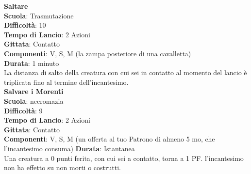 \begin{multicols}{2}
\medskip\textbf{Saltare}\\
\textbf{Scuola}: Trasmutazione\\
\textbf{Difficoltà}:  10\\
\textbf{Tempo di Lancio}: 2 Azioni\\
\textbf{Gittata}: Contatto\\
\textbf{Componenti}: V, S, M (la zampa posteriore di una cavalletta)\\
\textbf{Durata}: 1 minuto\\
La distanza di salto della creatura con cui sei in contatto al momento del lancio è triplicata fino al termine dell'incantesimo.\\

\medskip\textbf{Salvare i Morenti}\\
\textbf{Scuola}: necromazia\\
\textbf{Difficoltà}:  9\\
\textbf{Tempo di Lancio}: 2 Azioni\\
\textbf{Gittata}: Contatto\\
\textbf{Componenti}: V, S, M (un offerta al tuo Patrono di almeno 5 mo, che l'incantesimo consuma)
\textbf{Durata}: Istantanea\\
Una creatura a 0 punti ferita, con cui sei a contatto, torna a 1 PF. l'incantesimo non ha effetto su non morti o costrutti.


\end{multicols}
